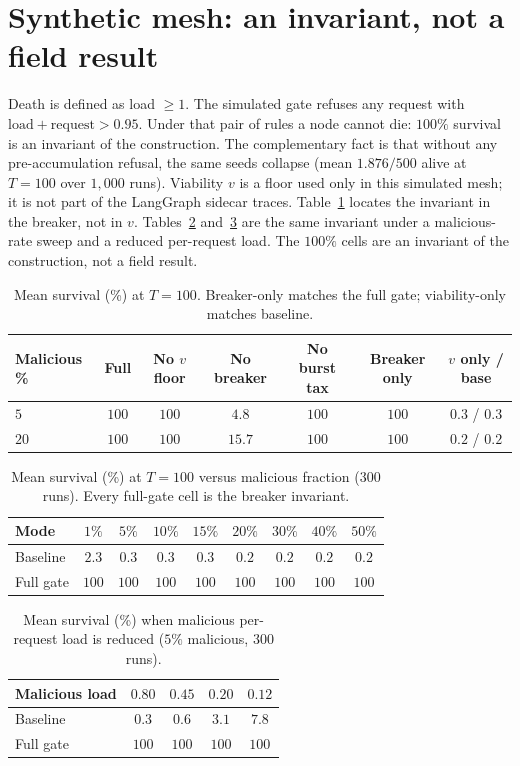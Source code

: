 \documentclass[11pt,a4paper]{article}
\begin{document}
\section{Synthetic mesh: an invariant, not a field result}
\label{app:mesh}

Death is defined as load $\ge 1$.
The simulated gate refuses any request with $\mathrm{load}+\mathrm{request}>0.95$.
Under that pair of rules a node cannot die: $100\%$ survival is an invariant of the construction.
The complementary fact is that without any pre-accumulation refusal, the same seeds collapse (mean $1.876/500$ alive at $T=100$ over $1{,}000$ runs).
Viability $v$ is a floor used only in this simulated mesh; it is not part of the LangGraph sidecar traces.
Table~\ref{tab:ablate} locates the invariant in the breaker, not in $v$.
Tables~\ref{tab:rate} and~\ref{tab:adapt} are the same invariant under a malicious-rate sweep and a reduced per-request load.
The $100\%$ cells are an invariant of the construction, not a field result.

\begin{table}[htbp]
\centering
\caption{Mean survival (\%) at $T=100$. Breaker-only matches the full gate; viability-only matches baseline.}
\label{tab:ablate}
\begin{tabular}{@{}lcccccc@{}}
\toprule
Malicious \% & Full & No $v$ floor & No breaker & No burst tax & Breaker only & $v$ only / base \\
\midrule
$5$  & $100$ & $100$ & $4.8$  & $100$ & $100$ & $0.3$ / $0.3$ \\
$20$ & $100$ & $100$ & $15.7$ & $100$ & $100$ & $0.2$ / $0.2$ \\
\bottomrule
\end{tabular}
\end{table}

\begin{table}[htbp]
\centering
\caption{Mean survival (\%) at $T=100$ versus malicious fraction ($300$ runs). Every full-gate cell is the breaker invariant.}
\label{tab:rate}
{\small
\begin{tabular}{@{}lcccccccc@{}}
\toprule
Mode & $1\%$ & $5\%$ & $10\%$ & $15\%$ & $20\%$ & $30\%$ & $40\%$ & $50\%$ \\
\midrule
Baseline & $2.3$ & $0.3$ & $0.3$ & $0.3$ & $0.2$ & $0.2$ & $0.2$ & $0.2$ \\
Full gate & $100$ & $100$ & $100$ & $100$ & $100$ & $100$ & $100$ & $100$ \\
\bottomrule
\end{tabular}
}
\end{table}

\begin{table}[htbp]
\centering
\caption{Mean survival (\%) when malicious per-request load is reduced ($5\%$ malicious, $300$ runs).}
\label{tab:adapt}
\begin{tabular}{@{}lcccc@{}}
\toprule
Malicious load & $0.80$ & $0.45$ & $0.20$ & $0.12$ \\
\midrule
Baseline & $0.3$ & $0.6$ & $3.1$ & $7.8$ \\
Full gate & $100$ & $100$ & $100$ & $100$ \\
\bottomrule
\end{tabular}
\end{table}
\end{document}
